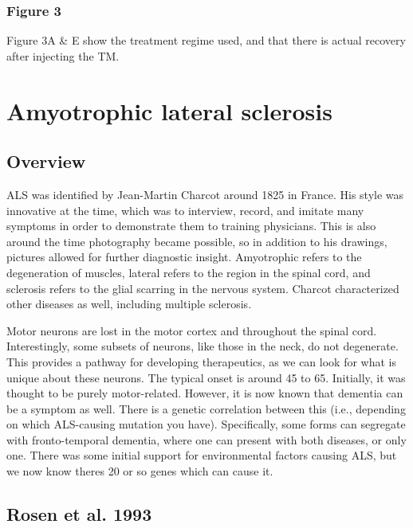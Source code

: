 \subsubsection*{Figure 3}

Figure 3A \& E show the treatment regime used, and that there is actual recovery after injecting the TM. 


\section*{Amyotrophic lateral sclerosis}

\subsection*{Overview}

ALS was identified by Jean-Martin Charcot around 1825 in France. His style was innovative at the time, which was to interview, record, and imitate many symptoms in order to demonstrate them to training physicians. This is also around the time photography became possible, so in addition to his drawings, pictures allowed for further diagnostic insight. Amyotrophic refers to the degeneration of muscles, lateral refers to the region in the spinal cord, and sclerosis refers to the glial scarring in the nervous system. Charcot characterized other diseases as well, including multiple sclerosis.\newline

Motor neurons are lost in the motor cortex and throughout the spinal cord. Interestingly, some subsets of neurons, like those in the neck, do not degenerate. This provides a pathway for developing therapeutics, as we can look for what is unique about these neurons. The typical onset is around 45 to 65. Initially, it was thought to be purely motor-related. However, it is now known that dementia can be a symptom as well. There is a genetic correlation between this (i.e., depending on which ALS-causing mutation you have). Specifically, some forms can segregate with fronto-temporal dementia, where one can present with both diseases, or only one. There was some initial support for environmental factors causing ALS, but we now know theres 20 or so genes which can cause it. 

\subsection*{Rosen et al. 1993}

